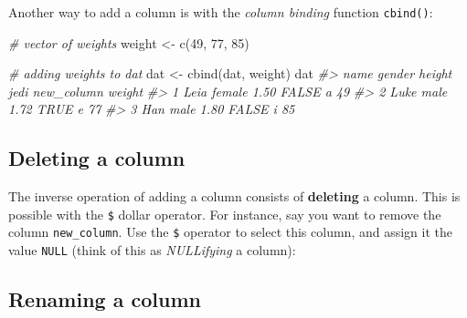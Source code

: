 \documentclass[
]{book}
\newenvironment{Shaded}{\begin{snugshade}}{\end{snugshade}}
\newcommand{\CommentTok}[1]{\textcolor[rgb]{0.56,0.35,0.01}{\textit{#1}}}
\newcommand{\ConstantTok}[1]{\textcolor[rgb]{0.00,0.00,0.00}{#1}}
\newcommand{\DecValTok}[1]{\textcolor[rgb]{0.00,0.00,0.81}{#1}}
\newcommand{\FunctionTok}[1]{\textcolor[rgb]{0.00,0.00,0.00}{#1}}
\newcommand{\NormalTok}[1]{#1}
\newcommand{\OtherTok}[1]{\textcolor[rgb]{0.56,0.35,0.01}{#1}}
\newcommand{\SpecialCharTok}[1]{\textcolor[rgb]{0.00,0.00,0.00}{#1}}
\begin{document}
Another way to add a column is with the \emph{column binding} function \texttt{cbind()}:

\begin{Shaded}
\begin{Highlighting}[]
\CommentTok{\# vector of weights}
\NormalTok{weight }\OtherTok{\textless{}{-}} \FunctionTok{c}\NormalTok{(}\DecValTok{49}\NormalTok{, }\DecValTok{77}\NormalTok{, }\DecValTok{85}\NormalTok{)}

\CommentTok{\# adding weights to dat}
\NormalTok{dat }\OtherTok{\textless{}{-}} \FunctionTok{cbind}\NormalTok{(dat, weight)}
\NormalTok{dat}
\CommentTok{\#\textgreater{}   name gender height  jedi new\_column weight}
\CommentTok{\#\textgreater{} 1 Leia female   1.50 FALSE          a     49}
\CommentTok{\#\textgreater{} 2 Luke   male   1.72  TRUE          e     77}
\CommentTok{\#\textgreater{} 3  Han   male   1.80 FALSE          i     85}
\end{Highlighting}
\end{Shaded}

\hypertarget{deleting-a-column}{%
\subsection{Deleting a column}\label{deleting-a-column}}

The inverse operation of adding a column consists of \textbf{deleting} a column.
This is possible with the \texttt{\$} dollar operator. For instance, say you want to
remove the column \texttt{new\_column}. Use the \texttt{\$} operator to select this column,
and assign it the value \texttt{NULL} (think of this as \emph{NULLifying} a column):

\begin{Shaded}
\end{Shaded}

\hypertarget{renaming-a-column}{%
\subsection{Renaming a column}\label{renaming-a-column}}
\end{document}
